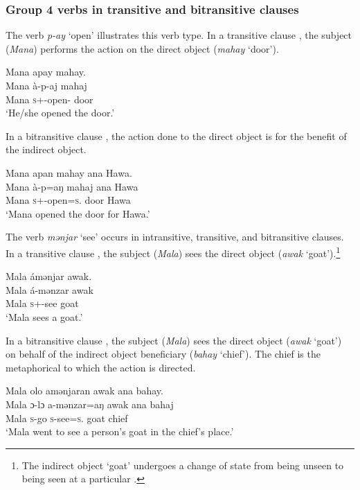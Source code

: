 \subsubsection[in transitive and bitransitive clauses]{Group 4 verbs in transitive and bitransitive clauses}\label{sec:9.2.4.1}

The verb \textit{p-ay} ‘open’ illustrates this verb type. In a transitive clause , the subject (\textit{Mana}) performs the action on the direct object (\textit{mahay} ‘door’). 


\ea \label{ex:9:15}
Mana  apay  mahay.\\
\gll  Mana   à-p-aj    mahaj\\
      Mana  \textsc{s}+{\PFV}-open{}-{\CL}  door\\
\glt  ‘He/she opened the door.’ 
\z

In a bitransitive clause , the action done to the direct object is for the benefit of the indirect object.

\ea \label{ex:9:16}
Mana  apan  mahay  ana  Hawa.\\
\gll  Mana   à-p=aŋ      mahaj  ana  Hawa\\
      Mana  \textsc{s}+{\PFV}-open=\textsc{s}.{\IO}  door  {\DAT} Hawa\\
\glt  ‘Mana opened the door for Hawa.’ 
\z

The verb \textit{mənjar} ‘see’ occurs in intransitive, transitive, and bitransitive clauses. In a transitive clause , the subject (\textit{Mala}) sees the direct object (\textit{awak} ‘goat’).\footnote{The indirect object ‘goat’ undergoes a change of state from being unseen to being seen at a particular \LOC.} 

\ea \label{ex:9:17}
Mala  ámənjar  awak.\\
\gll  Mala á-mənzar   awak\\
      Mala  \textsc{s}+{\IFV}-see  goat\\
\glt  ‘Mala sees a goat.’{ }
\z

In a bitransitive clause , the subject (\textit{Mala}) sees the direct object (\textit{awak} ‘goat’) on behalf of the indirect object beneficiary (\textit{bahay} ‘chief’). The chief is the metaphorical \LOC to which the action is directed.

\ea \label{ex:9:18}
Mala  olo  amənjaran  awak  ana  bahay.\\
\gll  Mala  ɔ{}-lɔ    a-mənzar=aŋ  awak  ana  bahaj\\
      Mala  \textsc{s}-go  \textsc{s}-see=\textsc{s}.{\IO}  goat  {\DAT} chief\\
\glt  ‘Mala went to see a person’s goat in the chief’s place.’{ }
\z

